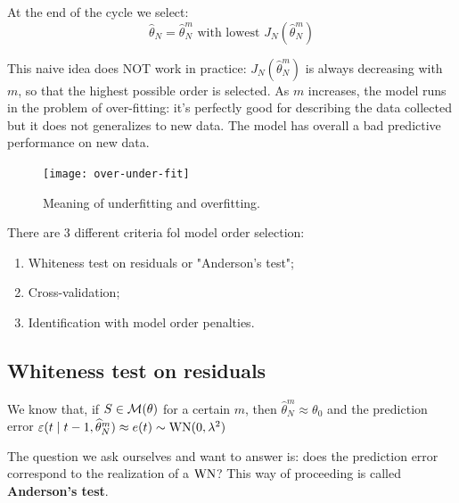 
At the end of the cycle we select:
\begin{equation*}
\hat{\theta }_{N} =\hat{\theta }_{N}^{m} \text{ with lowest } J_{N}(\hat{\theta }_{N}^{m})
\end{equation*}
\begin{rem}
	This naive idea does NOT work in practice: $ J_{N}(\hat{\theta }_{N}^{m})$ is always decreasing with $ m$, so that the highest possible order is selected. As $m$ increases, the model runs in the problem of over-fitting: it's perfectly good for describing the data collected but it does not generalizes to new data. The model has overall a bad predictive performance on new data.
\end{rem}
\begin{figure}[htpb]
    \centering
    \texttt{[image: over-under-fit]}
    \caption{Meaning of underfitting and overfitting.}
\end{figure}
\FloatBarrier

There are 3 different criteria fol model order selection:
\begin{enumerate}
    \item Whiteness test on residuals or "Anderson's test";
    \item Cross-validation;
    \item Identification with model order penalties.
\end{enumerate}


\subsection{Whiteness test on residuals}

We know that, if $S\in\mathcal{M}(\theta)$ for a certain $m$, then $\hat\theta_N^m\approx\theta_0$ and the prediction error $\varepsilon(t\mid t-1,\widehat\theta_N^m)\approx e(t) \sim \operatorname{WN}(0,\lambda^2)$

The question we ask ourselves and want to answer is: does the prediction error correspond to the realization of a $\operatorname{WN}$? This way of proceeding is called \textbf{Anderson's test}.

